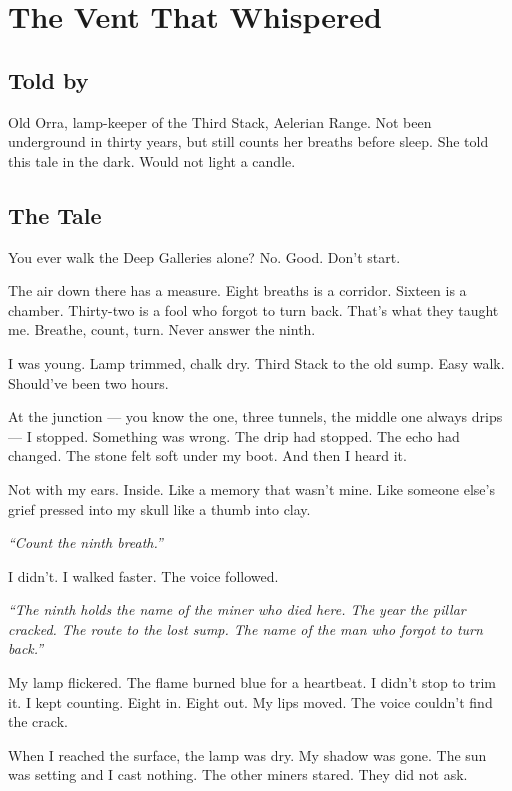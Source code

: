 \chapter{The Vent That Whispered}

\section*{Told by}

Old Orra, lamp-keeper of the Third Stack, Aelerian Range. Not been underground in thirty years, but still counts her breaths before sleep. She told this tale in the dark. Would not light a candle.

\section*{The Tale}

You ever walk the Deep Galleries alone? No. Good. Don't start.

The air down there has a measure. Eight breaths is a corridor. Sixteen is a chamber. Thirty-two is a fool who forgot to turn back. That's what they taught me. Breathe, count, turn. Never answer the ninth.

I was young. Lamp trimmed, chalk dry. Third Stack to the old sump. Easy walk. Should've been two hours.

At the junction --- you know the one, three tunnels, the middle one always drips --- I stopped. Something was wrong. The drip had stopped. The echo had changed. The stone felt soft under my boot. And then I heard it.

Not with my ears. Inside. Like a memory that wasn't mine. Like someone else's grief pressed into my skull like a thumb into clay.

\emph{``Count the ninth breath.''}

I didn't. I walked faster. The voice followed.

\emph{``The ninth holds the name of the miner who died here. The year the pillar cracked. The route to the lost sump. The name of the man who forgot to turn back.''}

My lamp flickered. The flame burned blue for a heartbeat. I didn't stop to trim it. I kept counting. Eight in. Eight out. My lips moved. The voice couldn't find the crack.

When I reached the surface, the lamp was dry. My shadow was gone. The sun was setting and I cast nothing. The other miners stared. They did not ask.

